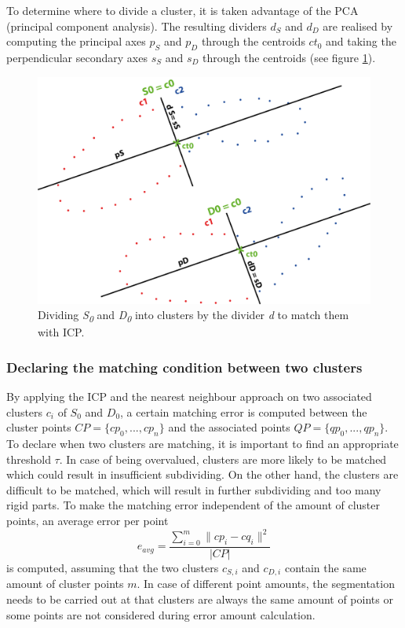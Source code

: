 \documentclass[a4paper,english,11pt]{report}
\begin{document}
To determine where to divide a cluster, it is taken advantage of the PCA (principal component analysis). The resulting dividers $d_S$ and $d_D$ are realised by computing the principal axes $p_S$ and $p_D$ through the centroids $ct_0$ and taking the perpendicular secondary axes $s_S$ and $s_D$ through the centroids (see figure \ref{fig:dc_axes_2p}).

\begin{figure}
	\centering
	\includegraphics[width=0.7\linewidth]{illustration_axes}
	\caption{Dividing \textit{S\textsubscript{0}} and \textit{D\textsubscript{0}} into clusters by the divider \textit{d} to match them with ICP.}
	\label{fig:dc_axes_2p}
\end{figure}

\subsubsection{Declaring the matching condition between two clusters}

By applying the ICP and the nearest neighbour approach on two associated clusters $c_i$ of $S_0$ and $D_0$, a certain matching error is computed between the cluster points
$ CP =  \{ {cp_0, ..., cp_n}\}$ and the associated points $ QP =  \{ {qp_0, ..., qp_n}\}$. To declare when two clusters are matching, it is important to find an appropriate threshold $\tau$. In case of being overvalued, clusters are more likely to be matched which could result in insufficient subdividing. On the other hand, the clusters are difficult to be matched, which will result in further subdividing and too many rigid parts. To make the matching error independent of the amount of cluster points, an average error per point
%
\begin{equation}
e_{avg} = \frac{\displaystyle\sum_{i=0}^{m}\| cp_i - cq_i\|^2}{| CP |}
\end{equation}
%
is computed, assuming that the two clusters $c_{S, i}$ and $c_{D, i}$ contain the same amount of cluster points $m$. In case of different point amounts, the segmentation needs to be carried out at that clusters are always the same amount of points or some points are not considered during error amount calculation.
\end{document}
